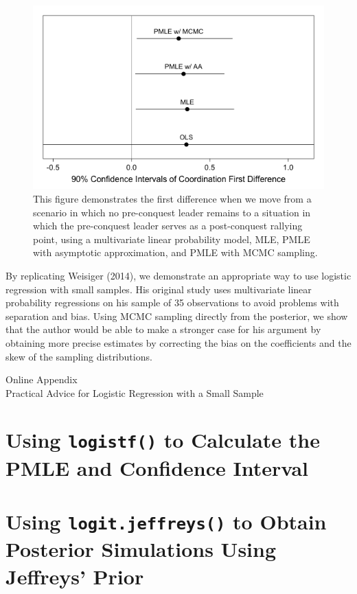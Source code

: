 \documentclass[12pt]{article}
\begin{document}
\begin{figure}[H]
\begin{center}
\includegraphics[width = \textwidth]{weisiger-coordfd.png}
\caption{This figure demonstrates the first difference when we move from a scenario in which no pre-conquest leader remains to a situation in which the pre-conquest leader serves as a post-conquest rallying point, using a multivariate linear probability model, MLE, PMLE with asymptotic approximation, and PMLE with MCMC sampling.}\label{fig:coord-fd}
\end{center}
\end{figure}

By replicating Weisiger (2014), we demonstrate an appropriate way to use logistic regression with small samples. His original study uses multivariate linear probability regressions on his sample of 35 observations to avoid problems with separation and bias. Using MCMC sampling directly from the posterior, we show that the author would be able to make a stronger case for his argument by obtaining more precise estimates by correcting the bias on the coefficients and the skew of the sampling distributions. 

\newpage
\begin{appendix}
\begin{center}
{\LARGE Online Appendix}\\
{\large Practical Advice for Logistic Regression with a Small Sample}\\\vspace{2mm}
\end{center}


\section{Using \texttt{logistf()} to Calculate the PMLE and Confidence Interval}

\section{Using \texttt{logit.jeffreys()} to Obtain Posterior Simulations Using Jeffreys' Prior}

\end{appendix}
\end{document}
